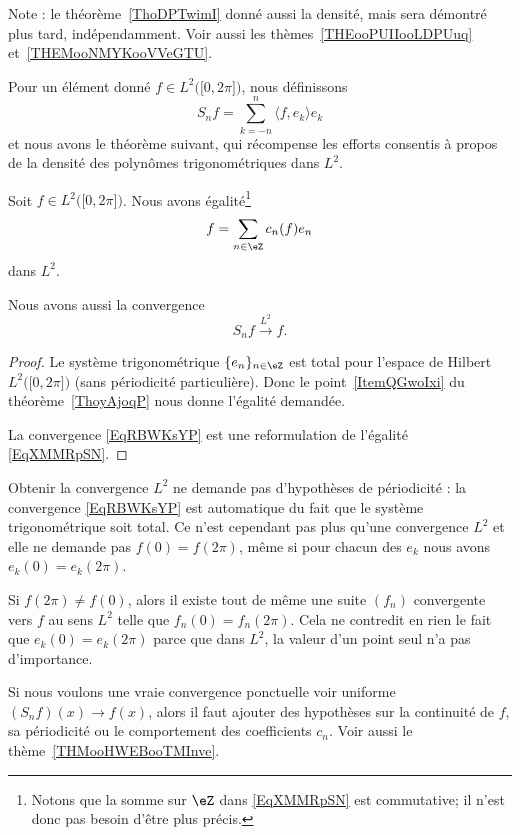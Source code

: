 Note : le théorème~\ref{ThoDPTwimI} donné aussi la densité, mais sera démontré plus tard, indépendamment. Voir aussi les thèmes~\ref{THEooPUIIooLDPUuq} et~\ref{THEMooNMYKooVVeGTU}.

Pour un élément donné \( f\in L^2\big( \mathopen[ 0 , 2\pi \mathclose] \big)\), nous définissons
\begin{equation}
    S_nf=\sum_{k=-n}^n\langle f, e_k\rangle e_k
\end{equation}
et nous avons le théorème suivant, qui récompense les efforts consentis à propos de la densité des polynômes trigonométriques dans \( L^2\).

\begin{theorem} \label{ThoYDKZLyv}
    Soit \( f\in L^2\big( \mathopen[ 0 , 2\pi \mathclose] \big)\). Nous avons égalité\footnote{Notons que la somme sur \( \eZ\) dans \eqref{EqXMMRpSN} est commutative; il n'est donc pas besoin d'être plus précis.}
    \begin{equation}    \label{EqXMMRpSN}
        f=\sum_{n\in \eZ}c_n(f)e_n
    \end{equation}
    dans \( L^2\).

    Nous avons aussi la convergence
\begin{equation}    \label{EqRBWKsYP}
    S_nf\stackrel{L^2}{\to} f.
\end{equation}
\end{theorem}

\begin{proof}
    Le système trigonométrique \( \{ e_n \}_{n\in \eZ}\) est total pour l'espace de Hilbert \( L^2\big( \mathopen[ 0 , 2\pi \mathclose] \big)\) (sans périodicité particulière). Donc le point~\ref{ItemQGwoIxi} du théorème~\ref{ThoyAjoqP} nous donne l'égalité demandée.

    La convergence \eqref{EqRBWKsYP} est une reformulation de l'égalité \eqref{EqXMMRpSN}.
\end{proof}

\begin{normaltext}
    Obtenir la convergence \( L^2\) ne demande pas d'hypothèses de périodicité : la convergence \eqref{EqRBWKsYP} est automatique du fait que le système trigonométrique soit total. Ce n'est cependant pas plus qu'une convergence \( L^2\) et elle ne demande pas \( f(0)=f(2\pi)\), même si pour chacun des \( e_k\) nous avons \( e_k(0)=e_k(2\pi)\).

    Si \( f(2\pi)\neq f(0)\), alors il existe tout de même une suite \( (f_n)\) convergente vers \( f\) au sens \( L^2\) telle que \( f_n(0)=f_n(2\pi)\). Cela ne contredit en rien le fait que \( e_k(0)=e_k(2\pi)\) parce que dans \( L^2\), la valeur d'un point seul n'a pas d'importance.

    Si nous voulons une vraie convergence ponctuelle voir uniforme \( (S_nf)(x)\to f(x)\), alors il faut ajouter des hypothèses sur la continuité de \( f\), sa périodicité ou le comportement des coefficients \( c_n\). Voir aussi le thème~\ref{THMooHWEBooTMInve}.
\end{normaltext}


